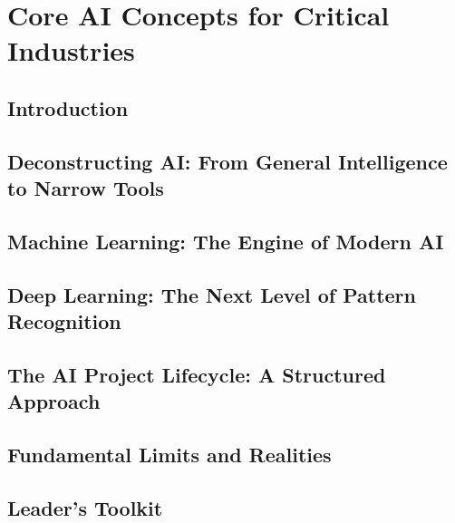 \chapter{Core AI Concepts for Critical Industries}
\label{chap:core_ai_concepts_for_critical_industries}

\section{Introduction}
\label{sec:core_ai_introduction}

\section{Deconstructing AI: From General Intelligence to Narrow Tools}
\label{sec:deconstructing_ai}

\section{Machine Learning: The Engine of Modern AI}
\label{sec:machine_learning}

\section{Deep Learning: The Next Level of Pattern Recognition}
\label{sec:deep_learning}

\section{The AI Project Lifecycle: A Structured Approach}
\label{sec:ai_project_lifecycle}

\section{Fundamental Limits and Realities}
\label{sec:fundamental_limits}

\section{Leader's Toolkit}
\label{sec:core_ai_leaders_toolkit}